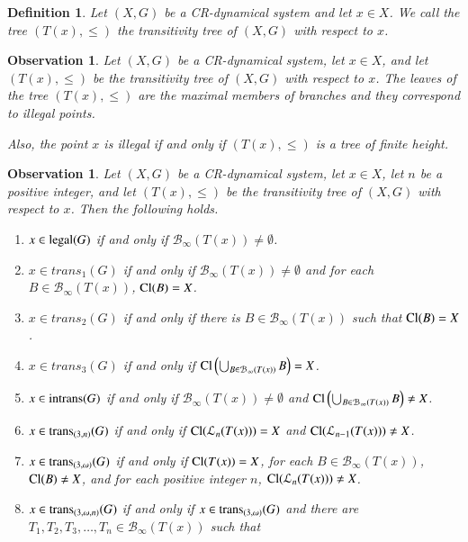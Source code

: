 \documentclass[a4paper,12pt]{article} %
\newcommand{\illegal}{\textup{illegal}}
\newcommand{\legal}{\textup{legal}}
\newcommand{\trans}{\textup{trans}}
\newcommand{\intrans}{\textup{intrans}}
\newtheorem{definition}[theorem]{Definition}
\newtheorem{observation}[theorem]{Observation}
\newcommand{\Cl}  {\mathop{\rm Cl}\nolimits}
\begin{document}
\begin{definition}
Let $(X,G)$ be a CR-dynamical system and let $x\in X$. We call the tree $(T(x),\leq)$ \emph{\color{blue} the transitivity tree of $(X,G)$ with respect to $x$}.
\end{definition}
\begin{observation}
Let $(X,G)$ be a CR-dynamical system, let $x\in X$, and let $(T(x),\leq)$ be the transitivity tree of $(X,G)$ with respect to $x$.  The leaves of the tree $(T(x),\leq)$ are the maximal members of branches and they correspond to illegal points.  

Also,  the point $x$ is illegal if and only if $(T(x),\leq)$ is a tree of finite height. 
\end{observation}
\begin{observation}
Let $(X,G)$ be a CR-dynamical system, let $x\in X$, let $n$ be a positive integer,  and let $(T(x),\leq)$ be the transitivity tree of $(X,G)$ with respect to $x$.  Then the following holds.
\begin{enumerate}
\item $x\in \legal(G)$ if and only if $\mathcal B_{\infty}(T(x))\neq \emptyset$.
\item $x\in trans_1(G)$ if and only if  $\mathcal B_{\infty}(T(x))\neq \emptyset$ and for each $B\in \mathcal B_{\infty}(T(x))$,  $\Cl(B)=X$.
\item $x\in trans_2(G)$ if and only if there is  $B\in \mathcal B_{\infty}(T(x))$ such that 
$\Cl(B)=X$.
\item $x\in trans_3(G)$ if and only if $ \Cl\left(\bigcup_{B\in \mathcal B_{\infty}(T(x))}B\right)=X$.
\item $x\in \intrans(G)$ if and only if $\mathcal B_{\infty}(T(x))\neq \emptyset$ and $ \Cl\left(\bigcup_{B\in \mathcal B_{\infty}(T(x))}B\right)\neq X$.
\item  $x\in \trans_{(3,n)}(G)$ if and only if $\Cl(\mathcal L_n(T(x)))=X$ and $\Cl(\mathcal L_{n-1}(T(x)))\neq X$.
\item \label{cmuz1} $x\in \trans_{(3,\omega)}(G)$ if and only if $\Cl(T(x))=X$, for each $B\in \mathcal B_{\infty}(T(x))$, $\Cl(B)\neq X$,  and for each positive integer $n$, $\Cl(\mathcal L_n(T(x)))\neq X$.  
\item\label{cmuz2}  $x\in \trans_{(3,\omega,n)}(G)$ if and only if  $x\in \trans_{(3,\omega)}(G)$ and there are $T_1,T_2,T_3,\ldots ,T_n\in \mathcal B_{\infty}(T(x))$  such that

\end{enumerate}
\end{observation}
\end{document}
